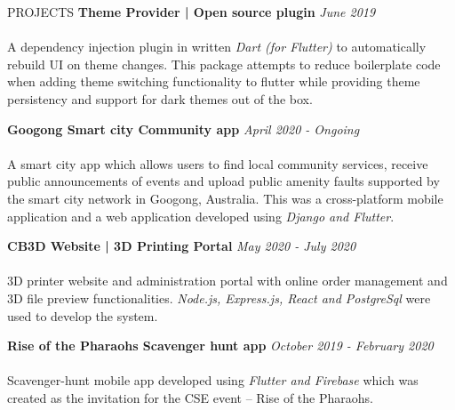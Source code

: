 \documentclass{cv}
\begin{document}
\begin{rSection}{PROJECTS}
    {\bf Theme Provider | Open source plugin}                       \hfill {\em June 2019}
    \\ \\
    A dependency injection plugin in written \textit{Dart (for Flutter)} to automatically rebuild
    UI on theme changes.
    This package attempts to reduce boilerplate code when adding theme switching functionality to flutter
    while providing theme persistency and support for dark themes out of the box. \par\vspace{5pt}

    {\bf Googong Smart city Community app}                  \hfill {\em April 2020 - Ongoing}
    \\ \\
    A smart city app which allows users to find local community services,
    receive public announcements of events and upload public amenity
    faults supported by the smart city network in Googong, Australia.
    This was a cross-platform mobile application and a web application developed
    using \textit{Django and Flutter}.
    \par\vspace{5pt}

    {\bf CB3D Website | 3D Printing Portal}                  \hfill {\em May 2020 - July 2020}
    \\ \\
    3D printer website and administration portal with online order management and 3D file preview functionalities.
    \textit{Node.js, Express.js, React and PostgreSql} were used to develop the system.
    \par\vspace{5pt}

    {\bf Rise of the Pharaohs Scavenger hunt app}                   \hfill {\em October 2019 - February 2020}
    \\ \\
    Scavenger-hunt mobile app developed using \textit{Flutter and Firebase} which was created as the invitation
    for the CSE event – Rise of the Pharaohs.  \par\vspace{5pt}


\end{rSection}
\end{document}
